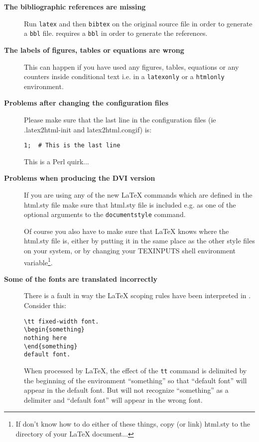 \begin{description}
\item [{\bf The bibliographic references are missing}]
Run {\tt latex} and then {\tt bibtex} on the original source file in
order to generate a {\tt bbl} file. \latextohtml requires a {\tt bbl}
in order to generate the references.

\item [{\bf The labels of figures, tables or equations are wrong}]
This can happen if you have used any figures, tables, equations or
any counters inside conditional text i.e. in a {\tt latexonly} 
or a {\tt htmlonly} environment. 

\item [{\bf Problems after changing the configuration files}]
Please make sure that the last line in the configuration files 
(ie {\fn .latex2html-init} and {\fn latex2html.congif}) is:
\begin{verbatim}
1;	# This is the last line
\end{verbatim}
This is a Perl quirk...

\item [{\bf Problems when producing the DVI version \label{htmlsty}}]
If you are using any of the new LaTeX commands which are defined in 
the {\fn html.sty} file make sure that 
{\fn html.sty} file is included e.g. as one of the optional arguments to the 
{\tt documentstyle} command.

Of course you also have to make sure that LaTeX knows where the html.sty
file is, either by putting it in the same place as the other style files on
your system, or by changing your TEXINPUTS shell environment variable\footnote{
If don't know how to do either of these things, copy (or link) html.sty 
to the directory of your LaTeX document...}.

\item [{\bf Some of the fonts are translated incorrectly}]
There is a fault in way the LaTeX scoping rules have been 
interpreted in \latextohtml. Consider this:
\begin{verbatim}
\tt fixed-width font.
\begin{something}
nothing here
\end{something}
default font.
\end{verbatim}
When processed by \LaTeX, the effect of the {\tt tt} command is
delimited
by the beginning of the environment ``something'' so that ``default font'' will
appear in the default font. But \latextohtml will not recognize
``something'' as a delimiter and ``default font'' will appear in the
wrong
font. 


\end{description}
